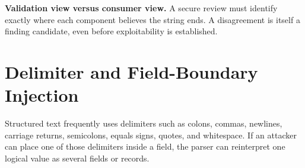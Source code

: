 \documentclass[11pt]{article}
\begin{document}
\begin{dangerousassumption}
\textbf{Validation view versus consumer view.} A secure review must identify exactly where each component believes the string ends. A disagreement is itself a finding candidate, even before exploitability is established.
\end{dangerousassumption}
\clearpage

\section{Delimiter and Field-Boundary Injection}

Structured text frequently uses delimiters such as colons, commas, newlines, carriage returns, semicolons, equals signs, quotes, and whitespace. If an attacker can place one of those delimiters inside a field, the parser can reinterpret one logical value as several fields or records.
\end{document}
